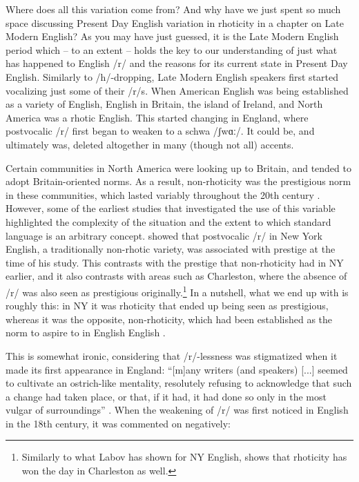 Where does all this variation come from? And why have we just spent so much space discussing Present Day English variation in rhoticity in a chapter on Late Modern English? As you may have just guessed, it is the Late Modern English period which -- to an extent -- holds the key to our understanding of just what has happened to English /r/ and the reasons for its current state in Present Day English. Similarly to /h/-dropping, Late Modern English speakers first started vocalizing just some of their /r/s. When American English was being established as a variety of English, English in Britain, the island of Ireland, and North America was a rhotic English. This started changing in England, where postvocalic /r/ first began to weaken to a schwa /ʃwɑː/. It could be, and ultimately was, deleted altogether in many (though not all) accents. 

Certain communities in North America were looking up to Britain, and tended to adopt Britain-oriented norms. As a result, non-rhoticity was the prestigious norm in these communities, which lasted variably throughout the 20th century \citep[142]{Becker2014}. However, some of the earliest studies that investigated the use of this variable highlighted the complexity of the situation and the extent to which standard language is an arbitrary concept. \citet{Labov1966} showed that postvocalic /r/ in New York English, a traditionally non-rhotic variety, was associated with prestige at the time of his study. This contrasts with the prestige that non-rhoticity had in NY earlier, and it also contrasts with areas such as Charleston, where the absence of /r/ was also seen as prestigious originally.\footnote{Similarly to what Labov has shown for NY English, \citet[Chapter 4]{Baranowski2006} shows that rhoticity has won the day in Charleston as well.} In a nutshell, what we end up with is roughly this: in NY it was rhoticity that ended up being seen as prestigious, whereas it was the opposite, non-rhoticity, which had been established as the norm to aspire to in English English \citep[139]{Montgomery2001}.

This is somewhat ironic, considering that /r/-lessness was stigmatized when it made its first appearance in England: ``[m]any writers (and speakers) [...] seemed to cultivate an ostrich-like mentality, resolutely refusing to acknowledge that such a change had taken place, or that, if it had, it had done so only in the most vulgar of surroundings'' \citep[99]{Mugglestone2003}. When the weakening of /r/ was first noticed in English in the 18th century, it was commented on negatively:

